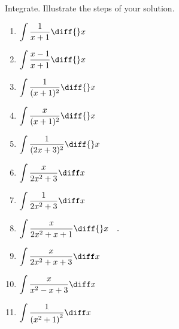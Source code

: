Integrate. Illustrate the steps of your solution. %
\begin{multicols}{2}
\begin{enumerate}[ref={\fcProblemRef}]
\item $\displaystyle \int \frac{1}{x+1}\diff {}x$

\item $\displaystyle \int \frac{x-1}{x+1}\diff {}x$


\item $\displaystyle \int \frac{ 1}{(x+1)^2}\diff {}x$


\item $\displaystyle \int \frac{x}{(x+1)^2}\diff {}x$


\item $\displaystyle \int \frac{ 1}{ (2x+3)^2}\diff {}x$

\item $\displaystyle
\int \frac{x}{ 2x^2+3}\diff x
$


\item $\displaystyle
\int \frac{1}{ 2x^2+3}\diff x
$


\item \label{problemIntegrate x/(2x^2+x+1) dx}
$\displaystyle\int \frac{x }{2x^2+x+1}\diff{}x\quad .
$

\item $\displaystyle
\int \frac{x}{ 2x^2+x+3}\diff x
$

\item $\displaystyle
\int \frac{x}{ x^2-x+3}\diff x
$

\item \label{problemint1/(x^2+1)^2dx}  $\displaystyle
\int \frac{1}{ \left(x^2+1\right)^2}\diff x
$


\end{enumerate}
\end{multicols}
